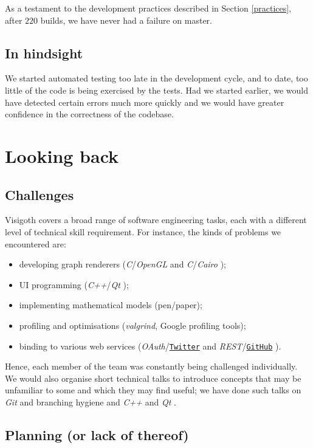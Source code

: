 \documentclass[a4paper,11pt,titlepage]{article}
\let\stdhref\href
\renewcommand{\href}[2]{\stdhref{#1}{\texttt{#2}}}
\let\stdsection\section         %
\renewcommand{\section}{\newpage\stdsection}
\newcommand{\buzz}[1]{\emph{#1}}
\newcommand{\Qt}{\buzz{Qt} }
\newcommand{\OpenGL}{\buzz{OpenGL} }
\newcommand{\Git}{\buzz{Git} }
\newcommand{\Cairo}{\buzz{Cairo} }
\newcommand{\Twitter}{\href{http://twitter.com}{Twitter} }
\newcommand{\GitHub}{\href{https://github.com}{GitHub} }
\begin{document}
As a testament to the development practices described in Section
\ref{practices}, after $220$ builds, we have never had a failure on
master.

\subsection{In hindsight}
We started automated testing too late in the development cycle, and to
date, too little of the code is being exercised by the tests. Had we
started earlier, we would have detected certain errors much more
quickly and we would have greater confidence in the correctness of the
codebase.

\section{Looking back}

\subsection{Challenges}
Visigoth covers a broad range of software engineering tasks, each with
a different level of technical skill requirement. For instance, the
kinds of problems we encountered are:
\begin{itemize}
\item developing graph renderers (\buzz{C}/\OpenGL and
  \buzz{C}/\Cairo);
\item UI programming (\buzz{C++}/\Qt);
\item implementing mathematical models (pen/paper);
\item profiling and optimisations (\buzz{valgrind}, Google profiling
  tools);
\item binding to various web services (\buzz{OAuth}/\Twitter and
  \buzz{REST}/\GitHub).
\end{itemize}

Hence, each member of the team was constantly being challenged
individually. We would also organise short technical talks to
introduce concepts that may be unfamiliar to some and which they may
find useful; we have done such talks on \Git and branching hygiene and
\buzz{C++} and \Qt.

\subsection{Planning (or lack of thereof)}
\end{document}
